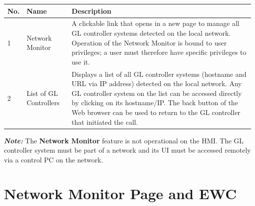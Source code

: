 \begin{longtable}[]{@{}lll@{}}
\toprule
\begin{minipage}[b]{0.04\columnwidth}\raggedright
No.\strut
\end{minipage} & \begin{minipage}[b]{0.23\columnwidth}\raggedright
Name\strut
\end{minipage} & \begin{minipage}[b]{0.65\columnwidth}\raggedright
Description\strut
\end{minipage}\tabularnewline
\midrule
\endhead
\begin{minipage}[t]{0.04\columnwidth}\raggedright
1\strut
\end{minipage} & \begin{minipage}[t]{0.23\columnwidth}\raggedright
Network Monitor\strut
\end{minipage} & \begin{minipage}[t]{0.65\columnwidth}\raggedright
A clickable link that opens in a new page to manage all GL controller
systems detected on the local network. Operation of the Network Monitor
is bound to user privileges; a user must therefore have specific
privileges to use it.\strut
\end{minipage}\tabularnewline
\begin{minipage}[t]{0.04\columnwidth}\raggedright
2\strut
\end{minipage} & \begin{minipage}[t]{0.23\columnwidth}\raggedright
List of GL Controllers\strut
\end{minipage} & \begin{minipage}[t]{0.65\columnwidth}\raggedright
Displays a list of all GL controller systems (hostname and URL via IP
address) detected on the local network. Any GL controller system on the
list can be accessed directly by clicking on its hostname/IP. The back
button of the Web browser can be used to return to the GL controller
that initiated the call.\strut
\end{minipage}\tabularnewline
\bottomrule
\end{longtable}

\textbf{\emph{Note:}} The \textbf{Network Monitor} feature is not
operational on the HMI. The GL controller system must be part of a
network and its UI must be accessed remotely via a control PC on the
network.


\section{Network Monitor Page and
EWC}

